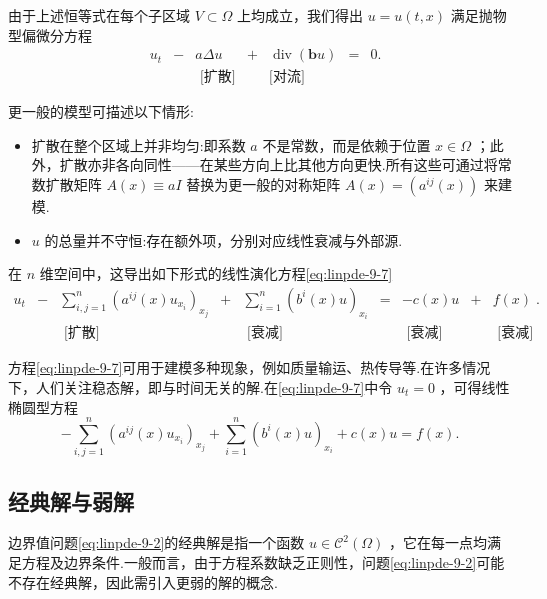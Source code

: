 由于上述恒等式在每个子区域 $V \subset  \Omega$ 上均成立，我们得出 $u = u\left( {t,x}\right)$ 满足抛物型偏微分方程
\[\begin{matrix}
    &{u}_{t}& - &{a\Delta u}&+ &\operatorname{div}\left( {\bm{b}u}\right)&  = &0.\\
    & & & \text{ [扩散]}& & \text{[对流] }& &
\end{matrix}\]


更一般的模型可描述以下情形:

\begin{itemize}\relax
\item\relax 扩散在整个区域上并非均匀:即系数 $a$ 不是常数，而是依赖于位置 $x \in  \Omega$ ；此外，扩散亦非各向同性——在某些方向上比其他方向更快.所有这些可通过将常数扩散矩阵 $A\left( x\right)  \equiv  {aI}$ 替换为更一般的对称矩阵 $A\left( x\right)  = \left( {{a}^{ij}\left( x\right) }\right)$ 来建模.
\end{itemize}

\begin{itemize}\relax
\item\relax $u$ 的总量并不守恒:存在额外项，分别对应线性衰减与外部源.
\end{itemize}

在 $n$ 维空间中，这导出如下形式的线性演化方程\eqref{eq:linpde-9-7}
\begin{equation}\tag{9.7}\label{eq:linpde-9-7}
\begin{matrix} {u}_{t} &  - & \sum_{{i,j = 1}}^{n}{\left( {a}^{ij}\left( x\right) {u}_{{x}_{i}}\right) }_{{x}_{j}} &  + & \sum_{{i = 1}}^{n}{\left( {b}^{i}\left( x\right) u\right) }_{{x}_{i}} &  = &  - c\left( x\right) u &  + & f\left( x\right) \;. \\   & & \text{ [扩散] } & & \text{ [衰减] } & & \text{ [衰减] } & & \text{ [衰减] } \end{matrix}
\end{equation}

方程\eqref{eq:linpde-9-7}可用于建模多种现象，例如质量输运、热传导等.在许多情况下，人们关注稳态解，即与时间无关的解.在\eqref{eq:linpde-9-7}中令 ${u}_{t} = 0$ ，可得线性椭圆型方程
\begin{equation}\tag{9.8}\label{eq:linpde-9-8}
- \sum_{{i,j = 1}}^{n}{\left( {a}^{ij}\left( x\right) {u}_{{x}_{i}}\right) }_{{x}_{j}} + \sum_{{i = 1}}^{n}{\left( {b}^{i}\left( x\right) u\right) }_{{x}_{i}} + c\left( x\right) u = f\left( x\right) .
\end{equation}

\subsection{经典解与弱解}
边界值问题\eqref{eq:linpde-9-2}的经典解是指一个函数 $u \in  {\mathcal{C}}^{2}\left( \Omega \right)$ ，它在每一点均满足方程及边界条件.一般而言，由于方程系数缺乏正则性，问题\eqref{eq:linpde-9-2}可能不存在经典解，因此需引入更弱的解的概念.

